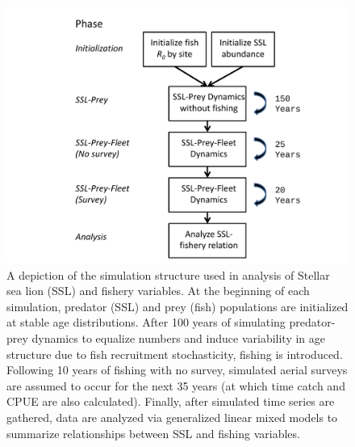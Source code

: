 \documentclass[nonumbib,leqno]{nrc1}
\begin{document}
\begin{figure}
\begin{center}
\includegraphics[width= \textwidth]{sim_diagram.pdf}
\end{center}
\caption{A depiction of the simulation structure used in analysis of Stellar sea lion (SSL) and fishery
 variables.  At the beginning of each simulation, predator (SSL) and prey (fish) populations are initialized at stable age distributions. After 100 years of simulating predator-prey dynamics to equalize numbers and induce variability in age structure due to fish recruitment stochasticity, fishing is introduced.  Following 10 years of fishing with no survey, simulated aerial surveys are assumed to occur for the next 35 years (at which time catch and CPUE are also calculated).  Finally, after simulated time series are gathered, data are analyzed via generalized linear mixed models to summarize relationships between SSL and fishing variables.}
\label{fig:sim_diagram}
\end{figure}
\end{document}
